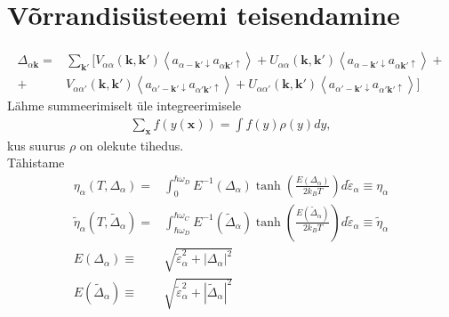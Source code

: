 \documentclass[class=article, crop=false]{standalone}
\begin{document}
\section{Võrrandisüsteemi teisendamine}
\begin{equation}\label{key}
	\begin{split}
		\Delta_{ \alpha \mathbf{k}} = & \sum_{ \mathbf{k}'} [ V_{ \alpha \alpha} ( \mathbf{k}, \mathbf{k}') \left\langle a_{ \alpha -\mathbf{k}' \downarrow} a_{ \alpha \mathbf{k}' \uparrow} \right\rangle + U_{ \alpha \alpha} ( \mathbf{k}, \mathbf{k}') \left\langle a_{ \alpha -\mathbf{k}' \downarrow} a_{ \alpha \mathbf{k}' \uparrow} \right\rangle + \\
		+ & V_{ \alpha \alpha'} ( \mathbf{k}, \mathbf{k}') \left\langle a_{ \alpha' -\mathbf{k}' \downarrow} a_{ \alpha' \mathbf{k}' \uparrow} \right\rangle + U_{ \alpha \alpha'} ( \mathbf{k}, \mathbf{k}') \left\langle a_{ \alpha' -\mathbf{k}' \downarrow} a_{ \alpha' \mathbf{k}' \uparrow} \right\rangle ]
	\end{split}
\end{equation}
Lähme summeerimiselt üle integreerimisele
\begin{equation}\label{key}
	\begin{split}
		\sum_{ \mathbf{x}} f (y( \mathbf{x})) = \int f (y) \rho (y) d y,
	\end{split}
\end{equation}
kus suurus $ \rho $ on olekute tihedus. \\
Tähistame
\begin{equation}\label{etaDefinitsioonid}
	\begin{split}
		\eta_{ \alpha} \left( T, \Delta_{ \alpha} \right) = & \int_{0}^{ \hbar \omega_{D}} E^{-1} ( \Delta_{ \alpha}) \tanh \left( \frac{E ( \Delta_{ \alpha})}{2 k_{B} T} \right) d \tilde{ \varepsilon}_{ \alpha} \equiv \eta_{ \alpha} \\
		\tilde{ \eta}_{ \alpha} \left( T, \tilde{ \Delta}_{ \alpha} \right) = & \int_{ \hbar \omega_{D}}^{ \hbar \omega_{C}} E^{-1} ( \tilde{ \Delta}_{ \alpha}) \tanh \left( \frac{E ( \tilde{ \Delta}_{ \alpha})}{2 k_{B} T} \right) d \tilde{ \varepsilon}_{ \alpha} \equiv \tilde{ \eta}_{ \alpha} \\
		E ( \Delta_{ \alpha}) \equiv & \sqrt{ \tilde{ \varepsilon}_{ \alpha}^{2} + | \Delta_{ \alpha}|^{2}} \\
		E ( \tilde{ \Delta}_{ \alpha}) \equiv & \sqrt{ \tilde{ \varepsilon}_{ \alpha}^{2} + | \tilde{ \Delta}_{ \alpha}|^{2}}
	\end{split}
\end{equation}
\end{document}

